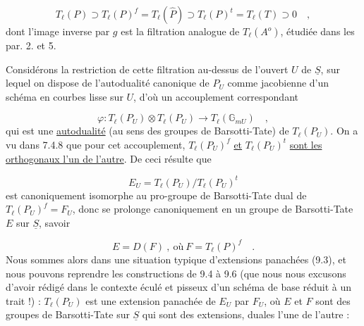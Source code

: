 \begin{equation}\tag{12.8.6}
T_\ell(P) \supset T_\ell(P)^f = T_\ell(\hat{P}) \supset T_\ell(P)^t = T_\ell(T) \supset 0 \quad ,
\end{equation}
dont l'image inverse par $g$ est la filtration analogue de $T_\ell(A^{o})$, étudiée dans les par. 2. et 5.

Considérons la restriction de cette filtration au-dessus de l'ouvert $U$ de $\underline{S}$, sur lequel on dispose de l'autodualité canonique de $P_U$ comme jacobienne d'un schéma en courbes lisse sur $U$, d'où un accouplement correspondant



\begin{equation}\tag{12.8.7}
\varphi : T_\ell(P_U) \otimes T_\ell(P_U) \longrightarrow T_\ell(\mathbb{G}_{mU}) \quad ,
\end{equation}
qui est une \underline{autodualité} (au sens des groupes de Barsotti-Tate) de $T_\ell(P_U)$. On a vu dans 7.4.8 \quad que pour cet accouplement, $T_\ell(P_U)^f$ \underline{et} $T_\ell(P_U)^t$ \underline{sont les orthogonaux l'un de l'autre}. De ceci résulte que

\begin{equation*}
E_U = T_\ell(P_U)/T_\ell(P_U)^t
\end{equation*}
est canoniquement isomorphe au pro-groupe de Barsotti-Tate dual de $T_\ell(P_U)^f = F_U$, donc se prolonge canoniquement en un groupe de Barsotti-Tate $E$ sur $\underline{S}$, savoir

\begin{equation}\tag{12.8.8}
E = D(F) \ , \ \text{où} \ F = T_\ell(P)^f \quad .
\end{equation}
Nous sommes alors dans une situation typique d'extensions panachées (9.3), et nous pouvons reprendre les constructions de 9.4 à 9.6 (que nous nous excusons d'avoir rédigé dans le contexte éculé et pisseux d'un schéma de base réduit à un trait !) : $T_\ell(P_U)$ est une extension panachée de $E_U$ par $F_U$, où $E$ et $F$ sont des groupes de Barsotti-Tate sur $\underline{S}$ qui sont des extensions, duales l'une de l'autre :


